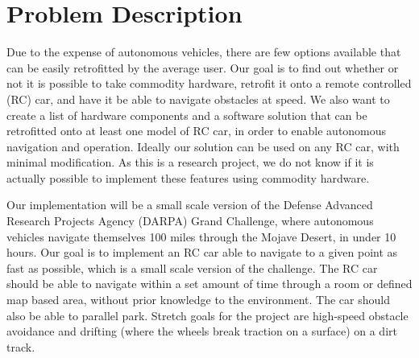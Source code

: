 \documentclass[draftclsnofoot,onecolumn,10pt]{IEEEtran}
\begin{document}
\section{Problem Description}
Due to the expense of autonomous vehicles, there are few options available that can be easily retrofitted by the average user. 
Our goal is to find out whether or not it is possible to take commodity hardware, retrofit it onto a remote controlled (RC) car, and have it be able to navigate obstacles at speed. 
We also want to create a list of hardware components and a software solution that can be retrofitted onto at least one model of RC car, in order to enable autonomous navigation and operation. 
Ideally our solution can be used on any RC car, with minimal modification. 
As this is a research project, we do not know if it is actually possible to implement these features using commodity hardware.\par
Our implementation will be a small scale version of the Defense Advanced Research Projects Agency (DARPA) Grand Challenge, where autonomous vehicles navigate themselves 100 miles through the Mojave Desert, in under 10 hours. 
Our goal is to implement an RC car able to navigate to a given point as fast as possible, which is a small scale version of the challenge. 
The RC car should be able to navigate within a set amount of time through a room or defined map based area, without prior knowledge to the environment.
The car should also be able to parallel park. 
Stretch goals for the project are high-speed obstacle avoidance and drifting (where the wheels break traction on a surface) on a dirt track.
\end{document}
